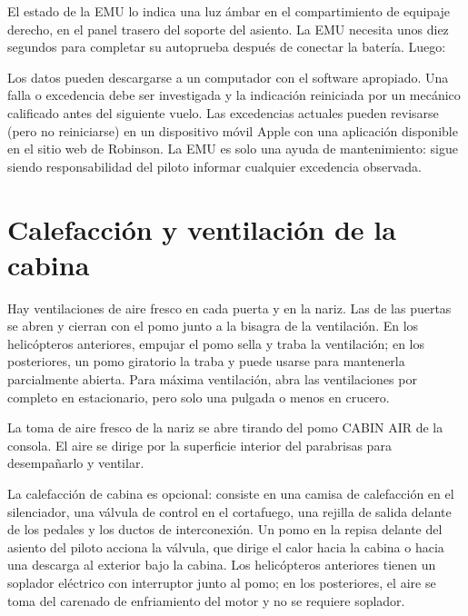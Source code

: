 El estado de la EMU lo indica una luz ámbar en el compartimiento de equipaje derecho, en el panel trasero del soporte del asiento. La EMU necesita unos diez segundos para completar su autoprueba después de conectar la batería. Luego:

\begin{checklist}
\end{checklist}

Los datos pueden descargarse a un computador con el software apropiado. Una falla o excedencia debe ser investigada y la indicación reiniciada por un mecánico calificado antes del siguiente vuelo. Las excedencias actuales pueden revisarse (pero no reiniciarse) en un dispositivo móvil Apple con una aplicación disponible en el sitio web de Robinson. La EMU es solo una ayuda de mantenimiento: sigue siendo responsabilidad del piloto informar cualquier excedencia observada.

\section{Calefacción y ventilación de la cabina}

Hay ventilaciones de aire fresco en cada puerta y en la nariz. Las de las puertas se abren y cierran con el pomo junto a la bisagra de la ventilación. En los helicópteros anteriores, empujar el pomo sella y traba la ventilación; en los posteriores, un pomo giratorio la traba y puede usarse para mantenerla parcialmente abierta. Para máxima ventilación, abra las ventilaciones por completo en estacionario, pero solo una pulgada o menos en crucero.

La toma de aire fresco de la nariz se abre tirando del pomo \textsf{CABIN AIR} de la consola. El aire se dirige por la superficie interior del parabrisas para desempañarlo y ventilar.

La calefacción de cabina es opcional: consiste en una camisa de calefacción en el silenciador, una válvula de control en el cortafuego, una rejilla de salida delante de los pedales y los ductos de interconexión. Un pomo en la repisa delante del asiento del piloto acciona la válvula, que dirige el calor hacia la cabina o hacia una descarga al exterior bajo la cabina. Los helicópteros anteriores tienen un soplador eléctrico con interruptor junto al pomo; en los posteriores, el aire se toma del carenado de enfriamiento del motor y no se requiere soplador.

